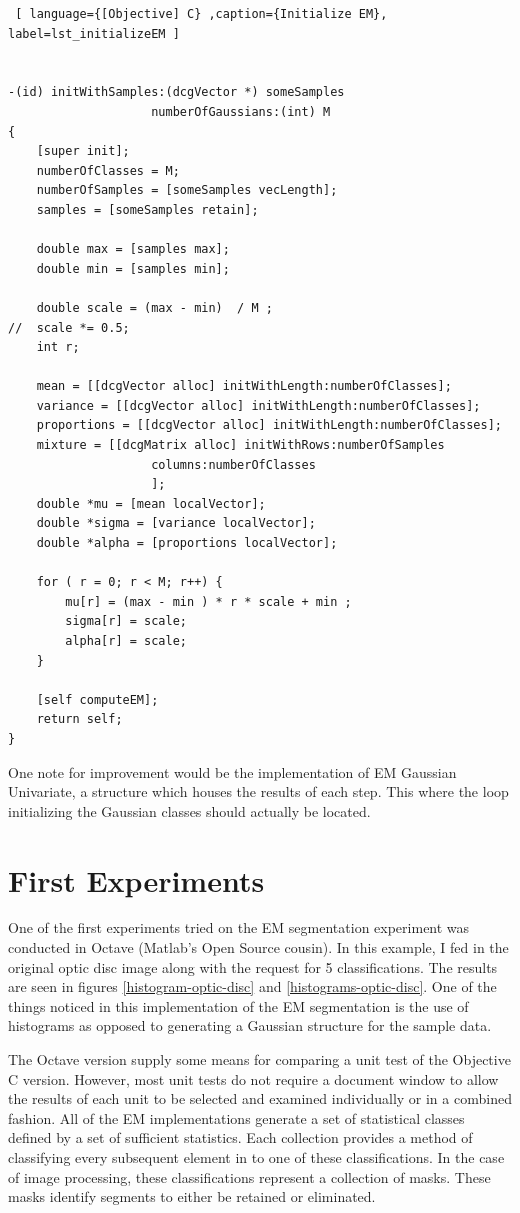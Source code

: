 \documentclass[11pt]{article}
\begin{document}
\begin{lstlisting} [ language={[Objective] C} ,caption={Initialize EM}, label=lst_initializeEM ] 


-(id) initWithSamples:(dcgVector *) someSamples
					numberOfGaussians:(int) M
{
	[super init];
	numberOfClasses = M;
	numberOfSamples = [someSamples vecLength];
	samples = [someSamples retain];

	double max = [samples max];
	double min = [samples min];
	
	double scale = (max - min)  / M ;
//	scale *= 0.5;
	int r;
	
	mean = [[dcgVector alloc] initWithLength:numberOfClasses];
	variance = [[dcgVector alloc] initWithLength:numberOfClasses];
	proportions = [[dcgVector alloc] initWithLength:numberOfClasses];
	mixture = [[dcgMatrix alloc] initWithRows:numberOfSamples
					columns:numberOfClasses
					];
	double *mu = [mean localVector];
	double *sigma = [variance localVector];
	double *alpha = [proportions localVector];
	
	for ( r = 0; r < M; r++) {
		mu[r] = (max - min ) * r * scale + min ;
		sigma[r] = scale;
		alpha[r] = scale;
	}

	[self computeEM];
	return self;
}					

\end{lstlisting}
One note for improvement would be the implementation of EM Gaussian Univariate, a structure which houses the results of each step.  This where the loop initializing the Gaussian classes should actually be located.  


\section{First Experiments}
One of the first experiments tried on the EM segmentation experiment was conducted in Octave (Matlab's Open Source cousin).   In this example, I fed in the original optic disc image along with the request for 5 classifications.   The results are seen in figures \ref{histogram-optic-disc} and \ref{histograms-optic-disc}.  One of the things noticed in this implementation of the EM segmentation is the use of histograms as opposed to generating a Gaussian structure for the sample data. 

The Octave version supply some means for comparing a unit test of the Objective C version. 
However, most unit tests do not require a document window to allow the results of each unit to be selected and examined individually or in a combined fashion.  All of the EM implementations generate a set of statistical classes defined by a set of sufficient statistics.  Each collection provides a method of classifying every subsequent element in to one of these classifications.  In the case of image processing, these classifications represent a collection of masks.  These masks identify segments to either be retained or eliminated.  
\end{document}

